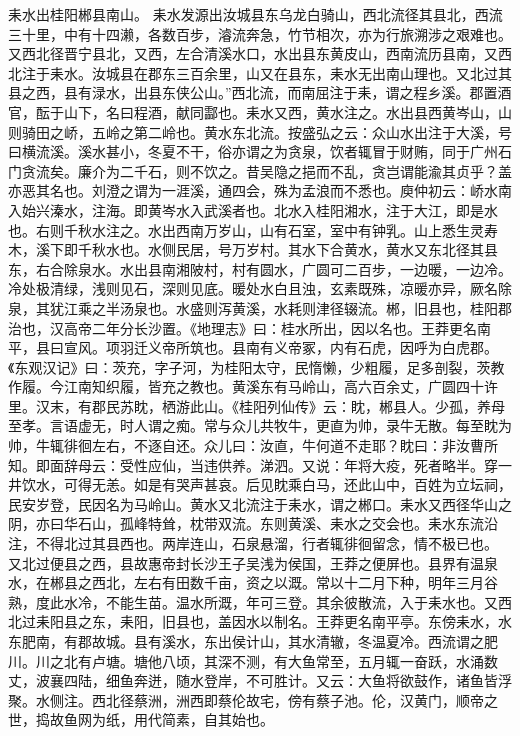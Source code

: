 \documentclass[12pt,UTF8]{ctexbook}
\begin{document}
耒水出桂阳郴县南山。
耒水发源出汝城县东乌龙白骑山，西北流径其县北，西流三十里，中有十四濑，各数百步，濬流奔急，竹节相次，亦为行旅溯涉之艰难也。又西北径晋宁县北，又西，左合清溪水口，水出县东黄皮山，西南流历县南，又西北注于耒水。汝城县在郡东三百余里，山又在县东，耒水无出南山理也。又北过其县之西，县有渌水，出县东侠公山。”西北流，而南屈注于耒，谓之程乡溪。郡置酒官，酝于山下，名曰程酒，献同酃也。耒水又西，黄水注之。水出县西黄岑山，山则骑田之峤，五岭之第二岭也。黄水东北流。按盛弘之云：众山水出注于大溪，号曰横流溪。溪水甚小，冬夏不干，俗亦谓之为贪泉，饮者辄冒于财贿，同于广州石门贪流矣。廉介为二千石，则不饮之。昔吴隐之挹而不乱，贪岂谓能渝其贞乎？盖亦恶其名也。刘澄之谓为一涯溪，通四会，殊为孟浪而不悉也。庾仲初云：峤水南入始兴溱水，注海。即黄岑水入武溪者也。北水入桂阳湘水，注于大江，即是水也。右则千秋水注之。水出西南万岁山，山有石室，室中有钟乳。山上悉生灵寿木，溪下即千秋水也。水侧民居，号万岁村。其水下合黄水，黄水又东北径其县东，右合除泉水。水出县南湘陂村，村有圆水，广圆可二百步，一边暖，一边冷。冷处极清绿，浅则见石，深则见底。暖处水白且浊，玄素既殊，凉暖亦异，厥名除泉，其犹江乘之半汤泉也。水盛则泻黄溪，水耗则津径辍流。郴，旧县也，桂阳郡治也，汉高帝二年分长沙置。《地理志》曰：桂水所出，因以名也。王莽更名南平，县曰宣风。项羽迁义帝所筑也。县南有义帝冢，内有石虎，因呼为白虎郡。《东观汉记》曰：茨充，字子河，为桂阳太守，民惰懒，少粗履，足多剖裂，茨教作履。今江南知织履，皆充之教也。黄溪东有马岭山，高六百余丈，广圆四十许里。汉末，有郡民苏眈，栖游此山。《桂阳列仙传》云：眈，郴县人。少孤，养母至孝。言语虚无，时人谓之痴。常与众儿共牧牛，更直为帅，录牛无散。每至眈为帅，牛辄徘徊左右，不逐自还。众儿曰：汝直，牛何道不走耶？眈曰：非汝曹所知。即面辞母云：受性应仙，当违供养。涕泗。又说：年将大疫，死者略半。穿一井饮水，可得无恙。如是有哭声甚哀。后见眈乘白马，还此山中，百姓为立坛祠，民安岁登，民因名为马岭山。黄水又北流注于耒水，谓之郴口。耒水又西径华山之阴，亦曰华石山，孤峰特耸，枕带双流。东则黄溪、耒水之交会也。耒水东流沿注，不得北过其县西也。两岸连山，石泉悬溜，行者辄徘徊留念，情不极已也。
又北过便县之西，县故惠帝封长沙王子吴浅为侯国，王莽之便屏也。县界有温泉水，在郴县之西北，左右有田数千亩，资之以溉。常以十二月下种，明年三月谷熟，度此水冷，不能生苗。温水所溉，年可三登。其余彼散流，入于耒水也。又西北过耒阳县之东，耒阳，旧县也，盖因水以制名。王莽更名南平亭。东傍耒水，水东肥南，有郡故城。县有溪水，东出侯计山，其水清辙，冬温夏冷。西流谓之肥川。川之北有卢塘。塘他八顷，其深不测，有大鱼常至，五月辄一奋跃，水涌数丈，波襄四陆，细鱼奔迸，随水登岸，不可胜计。又云：大鱼将欲鼓作，诸鱼皆浮聚。水侧注。西北径蔡洲，洲西即蔡伦故宅，傍有蔡子池。伦，汉黄门，顺帝之世，捣故鱼网为纸，用代简素，自其始也。
\end{document}
